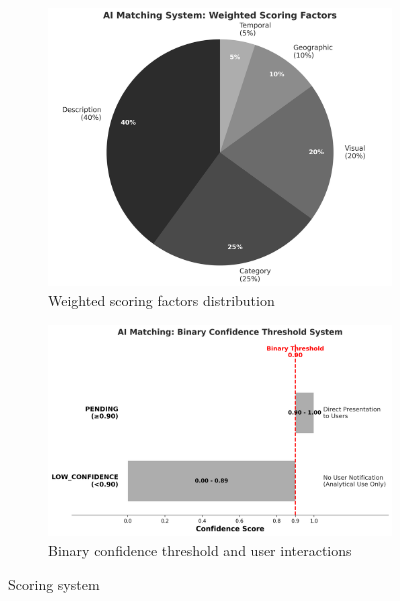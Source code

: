 \begin{figure}[htbp]
    \centering
    \begin{subfigure}[t]{0.48\textwidth}
        \centering
        \includegraphics[width=\textwidth]{figs/chapter4/scoring_factors_chart.png}
        \caption{Weighted scoring factors distribution}
        \label{fig:scoring_factors}
    \end{subfigure}
    \hfill
    \begin{subfigure}[t]{0.48\textwidth}
        \centering
        \includegraphics[width=\textwidth]{figs/chapter4/confidence_bands_chart.png}
        \caption{Binary confidence threshold and user interactions}
        \label{fig:confidence_bands}
    \end{subfigure}
    \caption{Scoring system}
    \label{fig:ai_scoring_system}
\end{figure}

